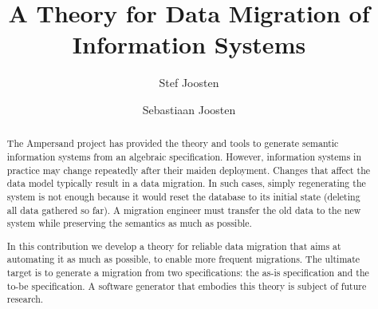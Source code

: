 \documentclass{elsarticle}
\begin{document}







\title{A Theory for Data Migration of Information Systems}
\author[ou,ordina]{Stef Joosten}
\author[umn]{Sebastiaan Joosten}
\address[ou]{Open Universiteit Nederland, Heerlen, the Netherlands}
\address[ordina]{Ordina NV, Nieuwegein, the Netherlands}
\address[umn]{University of Minnesota, Minneapolis, USA}

\begin{abstract}
   The Ampersand project has provided the theory and tools to generate semantic information systems from an algebraic specification.
   However, information systems in practice may change repeatedly after their maiden deployment.
   Changes that affect the data model typically result in a data migration.
   In such cases, simply regenerating the system is not enough because it would reset the database to its initial state (deleting all data gathered so far).
   A migration engineer must transfer the old data to the new system while preserving the semantics as much as possible.

   In this contribution we develop a theory for reliable data migration that aims at automating it as much as possible,
   to enable more frequent migrations.
   The ultimate target is to generate a migration from two specifications: the as-is specification and the to-be specification.
   A software generator that embodies this theory is subject of future research.
\end{abstract}
\end{document}
